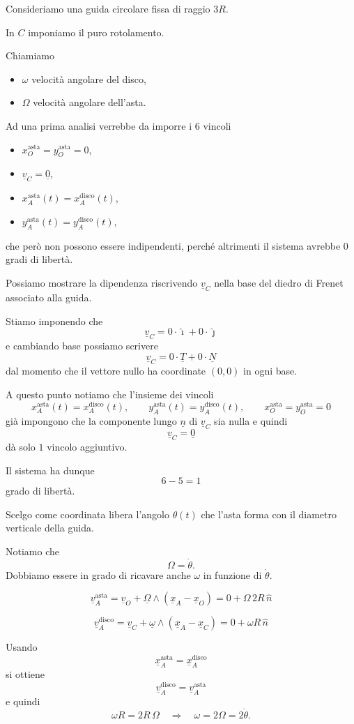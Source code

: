\begin{example}{}
\begin{center}
\begin{tikzpicture}[scale=0.9, >=stealth]
\end{tikzpicture}
\end{center}


Consideriamo una guida circolare fissa di raggio $3R$.

In $C$ imponiamo il puro rotolamento.

Chiamiamo
\begin{itemize}
    \item $\omega$ velocità angolare del disco,
    \item $\Omega$ velocità angolare dell'asta.
\end{itemize}

Ad una prima analisi verrebbe da imporre i $6$ vincoli
\begin{itemize}
    \item $x_O^{\text{asta}}=y_O^{\text{asta}}=0$,
    \item $\underline{v}_C=\underline{0}$,
    \item $x_A^{\text{asta}}(t)=x_A^{\text{disco}}(t)$,
    \item $y_A^{\text{asta}}(t)=y_A^{\text{disco}}(t)$,
\end{itemize}
che però non possono essere indipendenti, perché altrimenti il sistema avrebbe $0$ gradi di libertà.

Possiamo mostrare la dipendenza riscrivendo $\underline{v}_C$ nella base del diedro di Frenet associato alla guida.

Stiamo imponendo che
\[
\underline{v}_C=0\cdot \hat{\imath}+0\cdot \hat{\jmath}
\]
e cambiando base possiamo scrivere
\[
\underline{v}_C=0\cdot \underline{T}+0\cdot \underline{N}
\]
dal momento che il vettore nullo ha coordinate $(0,0)$ in ogni base.

A questo punto notiamo che l'insieme dei vincoli
\[
x_A^{\text{asta}}(t)=x_A^{\text{disco}}(t),
\qquad
y_A^{\text{asta}}(t)=y_A^{\text{disco}}(t),
\qquad
x_O^{\text{asta}}=y_O^{\text{asta}}=0
\]
già impongono che la componente lungo $\underline{n}$ di $\underline{v}_C$ sia nulla e quindi
\[
\underline{v}_C=\underline{0}
\]
dà solo $1$ vincolo aggiuntivo.

Il sistema ha dunque
\[
6-5=1
\]
grado di libertà.

Scelgo come coordinata libera l'angolo $\theta(t)$ che l'asta forma con il diametro verticale della guida.

Notiamo che
\[
\Omega=\dot{\theta}.
\]
Dobbiamo essere in grado di ricavare anche $\omega$ in funzione di $\dot{\theta}$.

\[
\underline{v}_A^{\text{asta}}
=
\underline{v}_O+\underline{\Omega}\wedge(\underline{x}_A-\underline{x}_O)
=
0+\Omega\,2R\,\hat{n}
\]

\[
\underline{v}_A^{\text{disco}}
=
\underline{v}_C+\underline{\omega}\wedge(\underline{x}_A-\underline{x}_C)
=
0+\omega R\,\hat{n}
\]

Usando
\[
\underline{x}_A^{\text{asta}}=\underline{x}_A^{\text{disco}}
\]
si ottiene
\[
\underline{v}_A^{\text{disco}}=\underline{v}_A^{\text{asta}}
\]
e quindi
\[
\omega R=2R\,\Omega
\quad\Rightarrow\quad
\omega=2\Omega=2\dot{\theta}.
\]
\end{example}
